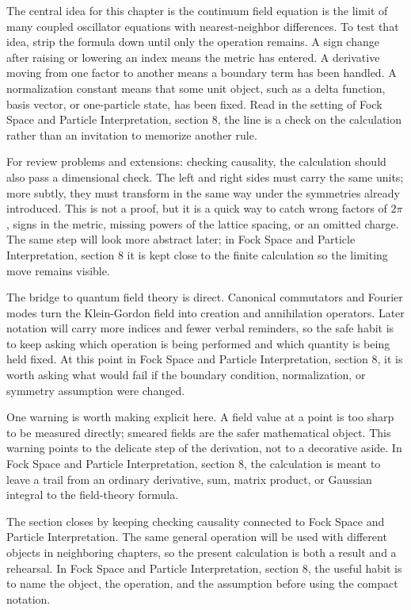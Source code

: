 The central idea for this chapter is the continuum field equation is the limit of many coupled oscillator equations with nearest-neighbor differences.  To test that idea, strip the formula down until only the operation remains.  A sign change after raising or lowering an index means the metric has entered.  A derivative moving from one factor to another means a boundary term has been handled.  A normalization constant means that some unit object, such as a delta function, basis vector, or one-particle state, has been fixed.  Read in the setting of Fock Space and Particle Interpretation, section 8, the line is a check on the calculation rather than an invitation to memorize another rule.

For review problems and extensions: checking causality, the calculation should also pass a dimensional check.  The left and right sides must carry the same units; more subtly, they must transform in the same way under the symmetries already introduced.  This is not a proof, but it is a quick way to catch wrong factors of \(2\pi\), signs in the metric, missing powers of the lattice spacing, or an omitted charge.  The same step will look more abstract later; in Fock Space and Particle Interpretation, section 8 it is kept close to the finite calculation so the limiting move remains visible.

The bridge to quantum field theory is direct.  Canonical commutators and Fourier modes turn the Klein-Gordon field into creation and annihilation operators.  Later notation will carry more indices and fewer verbal reminders, so the safe habit is to keep asking which operation is being performed and which quantity is being held fixed.  At this point in Fock Space and Particle Interpretation, section 8, it is worth asking what would fail if the boundary condition, normalization, or symmetry assumption were changed.

One warning is worth making explicit here.  A field value at a point is too sharp to be measured directly; smeared fields are the safer mathematical object.  This warning points to the delicate step of the derivation, not to a decorative aside.  In Fock Space and Particle Interpretation, section 8, the calculation is meant to leave a trail from an ordinary derivative, sum, matrix product, or Gaussian integral to the field-theory formula.

The section closes by keeping checking causality connected to Fock Space and Particle Interpretation.  The same general operation will be used with different objects in neighboring chapters, so the present calculation is both a result and a rehearsal.  In Fock Space and Particle Interpretation, section 8, the useful habit is to name the object, the operation, and the assumption before using the compact notation.



